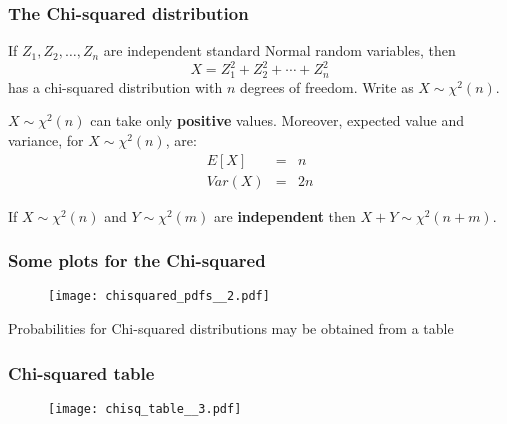 \documentclass[notes=show,smaller,handout]{beamer}\usepackage[]{graphicx}\usepackage[]{color}
\begin{document}
\begin{frame}%

\frametitle{The Chi-squared distribution}

\begin{definition}
If $Z_{1},Z_{2},\ldots ,Z_{n}$ are independent standard Normal random
variables, then%
\begin{equation*}
X=Z_{1}^{2}+Z_{2}^{2}+\cdots +Z_{n}^{2}
\end{equation*}%
has a chi-squared distribution with $n$ degrees of freedom. Write as $X\sim \chi ^{2}(n)$.
\end{definition}

$X\sim \chi ^{2}(n)$ can take only \textbf{positive }values. Moreover, expected value and variance, for $X\sim \chi ^{2}(n)$, are:
\begin{eqnarray*}
E\left[ X\right] &=&n \\
Var\left( X\right) &=&2n
\end{eqnarray*}

If $X\sim \chi ^{2}(n)$ and $Y\sim \chi ^{2}(m)$ are \textbf{%
independent} then $X+Y\sim \chi ^{2}(n+m)$.


\end{frame}

\begin{frame}%

\frametitle{Some plots for the Chi-squared}

\begin{figure}[ptb]\centering
\texttt{[image: chisquared\_pdfs\_\_2.pdf]}%
\end{figure}

Probabilities for Chi-squared distributions may be obtained from a table

\end{frame}%

\begin{frame}%

\frametitle{Chi-squared table}


\begin{figure}[ptb]\centering
\texttt{[image: chisq\_table\_\_3.pdf]}%
\end{figure}

\end{frame}%
\end{document}
